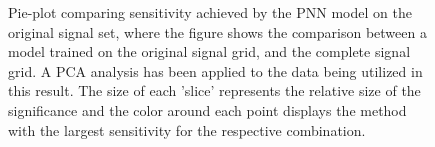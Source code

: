 \begin{figure}[H]
    \caption[Pie-plot comparing sensitivity achieved by the \acs{PNN} model on the original signal set, where the figure shows the comparison between a model trained 
    on the original signal grid, and the complete signal grid.]{Pie-plot comparing sensitivity achieved by the \acs{PNN} model on the original signal set, where the figure 
    shows the comparison between a model trained on the original signal grid, and the complete signal grid. A \ac{PCA} analysis has been applied to the data being utilized 
    in this result. The size of each 'slice' represents the relative size of the significance and the color around each 
    point displays the method with the largest sensitivity for the respective combination.}
    \label{fig:BigVsLittleSetPNN}
\end{figure}
\newpage